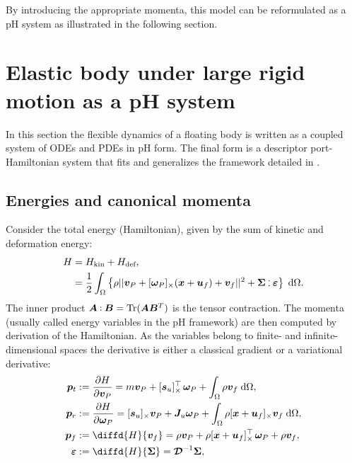 \documentclass{svjour3}                     %
\DeclareMathOperator{\Tr}{Tr}
\newcommand{\crmat}[1]{\ensuremath{[#1]_{\times}}}
\def\onedot{$\mathsurround0pt\ldotp$}
\def\cddot{%
	\mathbin{\vcenter{\baselineskip.67ex
			\hbox{\onedot}\hbox{\onedot}}%
}}
\begin{document}
 By introducing the appropriate momenta, this model can be reformulated as a pH system as illustrated in the following section.


\section{Elastic body under large rigid motion as a pH system}
\label{sec:pH_fd}
In this section the flexible dynamics of a floating body is written as a coupled system of ODEs and PDEs in pH form. The final form is a descriptor port-Hamiltonian system that fits and generalizes the framework detailed in \cite{beattie2018linear,mehrmann2019structurepreserving}.  

\subsection{Energies and canonical momenta}
Consider the total energy (Hamiltonian), given by the sum of kinetic and deformation energy:
\begin{equation}
\label{eq:H}
\begin{aligned}
H &= H_{\text{kin}} + H_{\text{def}}, \\
&= \frac{1}{2} \int_{\Omega} \left\{\rho ||\bm{v}_P + \crmat{\bm{\omega}_P} (\bm{x}+\bm{u}_f) + {\bm{v}}_f||^2 + \bm\Sigma \cddot \bm\varepsilon \right\}  \d{\Omega}.
\end{aligned}
\end{equation}
The inner product $\bm{A} \cddot \bm{B} = \Tr(\bm{A} \bm{B}^T)$ is the tensor contraction.  
The momenta (usually called energy variables in the pH framework) are then computed by derivation of the Hamiltonian. As the variables belong to finite- and infinite-dimensional spaces the derivative is either a classical gradient or a variational derivative:
\begin{equation}
\label{eq:momenta}
\begin{aligned}
\bm{p}_t &:= \diffp{H}{\bm{v}_P} = m \bm{v}_P + \crmat{\bm{s}_u}^\top \, \bm\omega_P + \int_{\Omega} \rho \bm{v}_f \d{\Omega}, \\
\bm{p}_r &:= \diffp{H}{\bm\omega_P} = \crmat{\bm{s}_u} \bm{v}_P + \bm{J}_u \bm\omega_P + \int_{\Omega} \rho \crmat{\bm{x}+\bm{u}_f} \bm{v}_f \d{\Omega}, \\
\bm{p}_f &:= \diffd{H}{\bm{v}_f} = \rho \bm{v}_P + \rho \crmat{\bm{x}+\bm{u}_f}^\top \, \bm\omega_P + \rho \bm{v}_f, \\
\bm\varepsilon &:= \diffd{H}{\bm\Sigma} = \bm{\mathcal{D}}^{-1} \bm\Sigma,
\end{aligned}
\end{equation}
\end{document}
